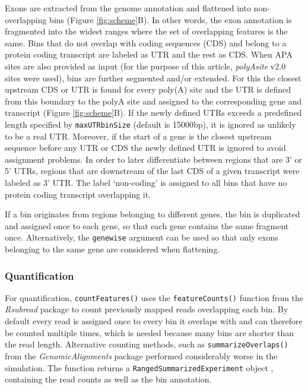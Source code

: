 \documentclass{bmcart}
\begin{document}
Exons are extracted from the genome annotation and flattened into non-overlapping bins (Figure \ref{fig:scheme}B). In other words, the exon annotation is fragmented into the widest ranges where the set of overlapping features is the same. Bins that do not overlap with coding sequences (CDS) and belong to a protein coding transcript are labeled as UTR and the rest as CDS. When APA sites are also provided as input (for the purpose of this article, \textit{polyAsite} v2.0 sites were used), bins are further segmented and/or extended. For this the closest upstream CDS or UTR is found for every poly(A) site and the UTR is defined from this boundary to the polyA site and assigned to the corresponding gene and transcript (Figure \ref{fig:scheme}B). If the newly defined UTRs exceeds a predefined length specified by \texttt{maxUTRbinSize} (default is 15000bp), it is ignored as unlikely to be a real UTR. Moreover, if the start of a gene is the closest upstream sequence before any UTR or CDS the newly defined UTR is ignored to avoid assignment problems. In order to later differentiate between regions that are 3' or 5' UTRs, regions that are downstream of the last CDS of a given transcript were labeled as 3' UTR. The label `non-coding' is assigned to all bins that have no protein coding transcript overlapping it.

If a bin originates from regions belonging to different genes, the bin is duplicated and assigned once to each gene, so that each gene contains the same fragment once. Alternatively, the \texttt{genewise} argument can be used so that only exons belonging to the same gene are considered when flattening.

\subsubsection{Quantification}

For quantification, \texttt{countFeatures()} uses the \texttt{featureCounts()} function from the \textit{Rsubread} package \cite{Liao2014FeatureCounts:Features} to count previously mapped reads overlapping each bin. By default every read is assigned once to every bin it overlaps with and can therefore be counted multiple times, which is needed because many bins are shorter than the read length. Alternative counting methods, such as \texttt{summarizeOverlaps()} from the \textit{GenomicAlignments} package \cite{Lawrence2013SoftwareRanges} performed considerably worse in the simulation. The function returns a \texttt{RangedSummarizedExperiment} object \cite{Morgan2018SummarizedExperiment:Container}, containing the read counts as well as the bin annotation. 
\end{document}
